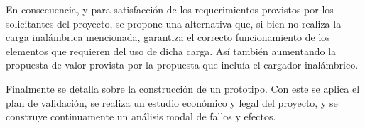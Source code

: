 En consecuencia, y para satisfacción de los requerimientos provistos por los solicitantes del proyecto, se propone una alternativa que, si bien no realiza la carga inalámbrica mencionada, garantiza el correcto funcionamiento de los elementos que requieren del uso de dicha carga.
Así también aumentando la propuesta de valor provista por la propuesta que incluía el cargador inalámbrico.

Finalmente se detalla sobre la construcción de un prototipo. Con este se aplica el plan de validación, se realiza un estudio económico y legal del proyecto, y se construye continuamente un análisis modal de fallos y efectos.

%